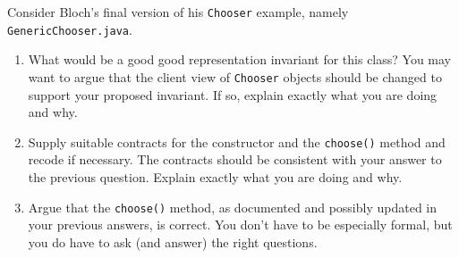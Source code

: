 Consider Bloch's final version of his {\tt Chooser} example, namely {\tt GenericChooser.java}.


\begin{enumerate}
\item
What would be a good good representation invariant for this class?
You may want to argue that the client
view of {\tt Chooser} objects  should be changed to support 
your proposed invariant.
If so, explain exactly what you are doing and why.
\item
Supply suitable contracts for the constructor and the {\tt choose()} method
and recode if necessary.
The contracts should be consistent with your answer to the previous question.
Explain exactly what you are doing and why.
\item
Argue that the {\tt choose()} method, as documented and possibly updated
in your previous answers, is correct.  
You don't have to be especially formal, but you do have
to ask (and answer) the right questions.  
\end{enumerate}
